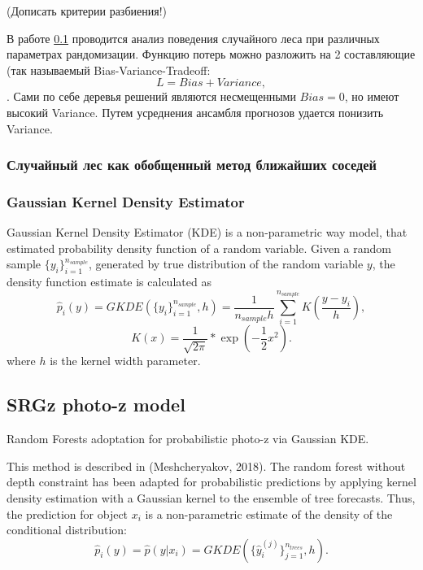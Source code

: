 \documentclass[fleqn,usenatbib]{mnras}
\begin{document}
(Дописать критерии разбиения!)

В работе \ref{} проводится анализ поведения случайного леса при различных параметрах рандомизации. Функцию потерь можно разложить на 2 составляющие (так называемый Bias-Variance-Tradeoff:
\begin{equation}\label{eq:bias-variance-tradeoff}
    L = Bias + Variance,
\end{equation}.
Сами по себе деревья решений являются несмещенными $Bias = 0$, но имеют высокий Variance. Путем усреднения ансамбля прогнозов удается понизить Variance.

\subsubsection{Случайный лес как обобщенный метод ближайших соседей}

\subsubsection{Gaussian Kernel Density Estimator}
Gaussian Kernel Density Estimator (KDE) is a non-parametric way model, that estimated probability density function of a random variable. Given a random sample $\{y_i\}_{i=1}^{n_{sample}}$, generated by true distribution of the random variable $y$, the density function estimate is calculated as\begin{equation}\label{eq:kde}
    \hat{p}_i (y) = GKDE(\{y_i\}_{i=1}^{n_{sample}}, h) = \frac{1}{n_{sample} h}\sum_{i=1}^{n_{sample}} K(\frac{y - y_i}{h}),
\end{equation}
\begin{equation}\label{eq:gaussian_kernel}
    K(x) = \frac{1}{\sqrt{2\pi}} * \exp{(-\frac{1}{2} x^2)}.
\end{equation}
where $h$ is the kernel width parameter.

\subsection{SRGz photo-z model}

Random Forests adoptation for probabilistic photo-z via Gaussian KDE.

This method is described in (Meshcheryakov, 2018). The random forest without depth constraint has been adapted for probabilistic predictions by applying kernel density estimation with a Gaussian kernel to the ensemble of tree forecasts. Thus, the prediction for object $x_i$ is a non-parametric estimate of the density of the conditional distribution:
\begin{equation}\label{eq:predproba}
    \hat{p}_i (y) = \hat{p}(y|x_i) = GKDE(\{\hat{y}^{(j)}_i\}_{j=1}^{n_{trees}}, h).
\end{equation}
\end{document}
